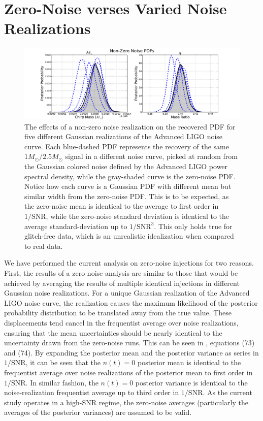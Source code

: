 \documentclass[11pt,a4paper]{emulateapj} 
\newcommand{\carl}[1]{{\color{red} #1}}
\begin{document}
\section{Zero-Noise verses Varied Noise Realizations}
\label{noiseSection}



\begin{figure}[b!]
  \centering \includegraphics[trim=2cm 0cm 0cm 0cm,
    clip=true,scale=0.52]{noisePDFflat.pdf}
 \caption{The effects of a non-zero noise realization on the recovered
   PDF for five different Gaussian realizations of the Advanced LIGO
   noise curve.  Each blue-dashed PDF represents the recovery of the same
   $1M_{\odot}/2.5M_{\odot}$ signal in a different noise curve, picked
   at random from the Gaussian colored noise defined by the Advanced
   LIGO power spectral density, while the gray-shaded curve is the
   zero-noise PDF.  \carl{Notice how each curve is a Gaussian PDF with different mean but similar 
   width from the zero-noise PDF.  This is to be expected, as the zero-noise mean is identical to the 
   average to first order in $1/\text{SNR}$, while the zero-noise standard deviation is identical to the average 
   standard-deviation
    up to $1/\text{SNR}^3$.  }
   This only holds true for glitch-free data, which is an unrealistic
   idealization when compared to real data.}
 \label{noisePDFs}
\end{figure}
     
     We have performed the current analysis on zero-noise injections for
two reasons.  First, the results of a zero-noise analysis are
similar to those that would be achieved by averaging the results of
multiple identical injections in different Gaussian noise
realizations.  For a unique Gaussian realization of the Advanced LIGO
noise curve, the realization causes the maximum likelihood of the
posterior probability distribution to be translated away from the true
value. These displacements tend cancel in the frequentist average over noise
 realizations, ensuring that the mean uncertainties should be nearly identical to 
   the uncertainty drawn from the zero-noise runs.  This can be seen in 
   \cite{Vallisneri}, equations (73) and (74).
  By expanding the posterior mean and the posterior variance as series in $1/\text{SNR}$,
   it can be seen that the 
  $n(t) = 0$ posterior mean is identical to the frequentist average 
  over noise realizations of the posterior mean to first order in $1/\text{SNR}$.  In similar
  fashion, the $n(t) = 0$ posterior variance is identical to the noise-realization frequentist 
  average up to third order in $1/\text{SNR}$.  As the current study operates in a high-SNR 
  regime, the zero-noise averages (particularly the averages of the posterior variances) are
   assumed to be valid.
\end{document}
